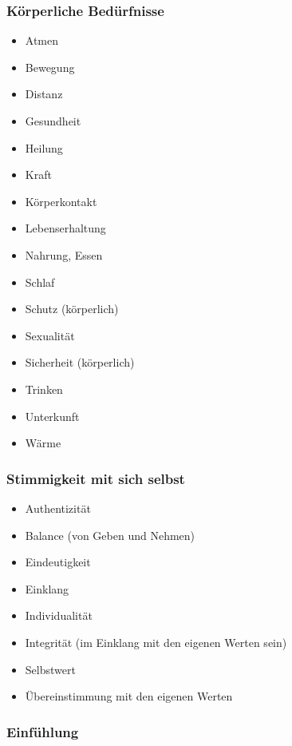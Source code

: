 \subsubsection{Körperliche Bedürfnisse}

\begin{multicols}{2}
  \begin{itemize}
    \item Atmen
    \item Bewegung
    \item Distanz
    \item Gesundheit
    \item Heilung
    \item Kraft
    \item Körperkontakt
    \item Lebenserhaltung
    \item Nahrung, Essen
    \item Schlaf
    \item Schutz (körperlich)
    \item Sexualität
    \item Sicherheit (körperlich)
    \item Trinken
    \item Unterkunft
    \item Wärme
  \end{itemize}
\end{multicols}


\subsubsection{Stimmigkeit mit sich selbst}

\begin{multicols}{2}
  \begin{itemize}
    \item Authentizität
    \item Balance (von Geben und Nehmen)
    \item Eindeutigkeit
    \item Einklang
    \item Individualität
    \item Integrität (im Einklang mit den eigenen Werten sein)
    \item Selbstwert
    \item Übereinstimmung mit den eigenen Werten
  \end{itemize}
\end{multicols}


\subsubsection{Einfühlung}

